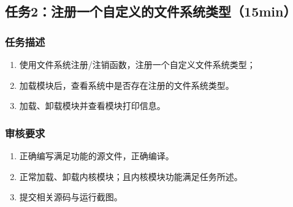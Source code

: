 \documentclass{article}
\begin{document}
\subsection{任务2：注册一个自定义的文件系统类型（15min）}

\subsubsection{任务描述}
\begin{enumerate}
	\item 使用文件系统注册/注销函数，注册一个自定义文件系统类型；
	\item 加载模块后，查看系统中是否存在注册的文件系统类型。
	\item 加载、卸载模块并查看模块打印信息。
\end{enumerate}

\subsubsection{审核要求}
\begin{enumerate}
	\item 正确编写满足功能的源文件，正确编译。
	\item 正常加载、卸载内核模块；且内核模块功能满足任务所述。
	\item 提交相关源码与运行截图。
\end{enumerate}
\end{document}
